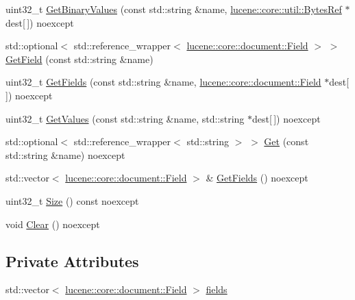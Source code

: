 \begin{DoxyCompactItemize}
\item 
uint32\+\_\+t \mbox{\hyperlink{classlucene_1_1core_1_1document_1_1Document_aa701ba52228c5faefba171031137a903}{Get\+Binary\+Values}} (const std\+::string \&name, \mbox{\hyperlink{classlucene_1_1core_1_1util_1_1BytesRef}{lucene\+::core\+::util\+::\+Bytes\+Ref}} $\ast$dest\mbox{[}$\,$\mbox{]}) noexcept
\item 
std\+::optional$<$ std\+::reference\+\_\+wrapper$<$ \mbox{\hyperlink{classlucene_1_1core_1_1document_1_1Field}{lucene\+::core\+::document\+::\+Field}} $>$ $>$ \mbox{\hyperlink{classlucene_1_1core_1_1document_1_1Document_a30942eeb99fd914220503b9f68d9bd6a}{Get\+Field}} (const std\+::string \&name)
\item 
uint32\+\_\+t \mbox{\hyperlink{classlucene_1_1core_1_1document_1_1Document_a8fcbb281ebfb1a4a075e189d099d3617}{Get\+Fields}} (const std\+::string \&name, \mbox{\hyperlink{classlucene_1_1core_1_1document_1_1Field}{lucene\+::core\+::document\+::\+Field}} $\ast$dest\mbox{[}$\,$\mbox{]}) noexcept
\item 
uint32\+\_\+t \mbox{\hyperlink{classlucene_1_1core_1_1document_1_1Document_a03e64a0e27656bbb43009af1de585191}{Get\+Values}} (const std\+::string \&name, std\+::string $\ast$dest\mbox{[}$\,$\mbox{]}) noexcept
\item 
std\+::optional$<$ std\+::reference\+\_\+wrapper$<$ std\+::string $>$ $>$ \mbox{\hyperlink{classlucene_1_1core_1_1document_1_1Document_aaa33b6b731feba963643568e9df77dfc}{Get}} (const std\+::string \&name) noexcept
\item 
std\+::vector$<$ \mbox{\hyperlink{classlucene_1_1core_1_1document_1_1Field}{lucene\+::core\+::document\+::\+Field}} $>$ \& \mbox{\hyperlink{classlucene_1_1core_1_1document_1_1Document_a1300520e8ac371b602712cfd279284b4}{Get\+Fields}} () noexcept
\item 
uint32\+\_\+t \mbox{\hyperlink{classlucene_1_1core_1_1document_1_1Document_ad1556e7f0c71a2f347850d6d40392b0c}{Size}} () const noexcept
\item 
void \mbox{\hyperlink{classlucene_1_1core_1_1document_1_1Document_a38df29c417f085cf8fe3741a4fef898f}{Clear}} () noexcept
\end{DoxyCompactItemize}
\subsection*{Private Attributes}
\begin{DoxyCompactItemize}
\item 
std\+::vector$<$ \mbox{\hyperlink{classlucene_1_1core_1_1document_1_1Field}{lucene\+::core\+::document\+::\+Field}} $>$ \mbox{\hyperlink{classlucene_1_1core_1_1document_1_1Document_af9530ebe88523c7b14063d7efeccf987}{fields}}
\end{DoxyCompactItemize}


